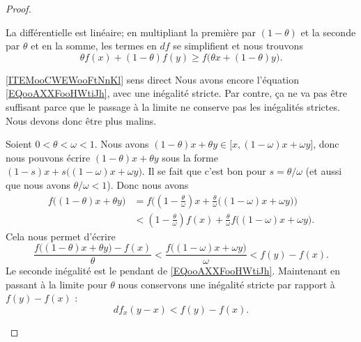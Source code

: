 \begin{proof}
\begin{subproof}
\begin{equation}
        \end{equation}
        La différentielle est linéaire; en multipliant la première par \( (1-\theta)\) et la seconde par \( \theta\) et en la somme, les termes en \( df\) se simplifient et nous trouvons
        \begin{equation}
            \theta f(x)+(1-\theta)f(y)\geq f\big( \theta x+(1-\theta)y \big).
        \end{equation}
    \item[\ref{ITEMooCWEWooFtNnKl} sens direct]
        Nous avons encore l'équation \eqref{EQooAXXFooHWtiJh}, avec une inégalité stricte. Par contre, ça ne va pas être suffisant parce que le passage à la limite ne conserve pas les inégalités strictes. Nous devons donc être plus malins. 

        Soient \( 0<\theta<\omega<1\). Nous avons \( (1-\theta)x+\theta y\in \mathopen[ x , (1-\omega)x+\omega y \mathclose]\), donc nous pouvons écrire \( (1-\theta)x+\theta y\) sous la forme \( (1-s)x+s\big( (1-\omega)x+\omega y \big)\). Il se fait que c'est bon pour \( s=\theta/\omega\) (et aussi que nous avons \( \theta/\omega<1\)). Donc nous avons
        \begin{subequations}
            \begin{align}
            f\big( (1-\theta)x+\theta y \big)&=f\Big( (1-\frac{ \theta }{ \omega })x+\frac{ \theta }{ \omega }\big( (1-\omega)x+\omega y \big) \Big)\\
            &<(1-\frac{ \theta }{ \omega })f(x)+\frac{ \theta }{ \omega }f\big( (1-\omega)x+\omega y \big).
            \end{align}
        \end{subequations}
        Cela nous permet d'écrire
        \begin{equation}
            \frac{ f\big( (1-\theta)x+\theta y \big)-f(x) }{ \theta }<\frac{ f\big( (1-\omega)x+\omega y \big) }{ \omega }<f(y)-f(x).
        \end{equation}
        Le seconde inégalité est le pendant de \eqref{EQooAXXFooHWtiJh}. Maintenant en passant à la limite pour \( \theta\) nous conservons une inégalité stricte par rapport à \( f(y)-f(x)\) :
        \begin{equation}
            df_x(y-x)<f(y)-f(x).
        \end{equation}
    \end{subproof}
\end{proof}

